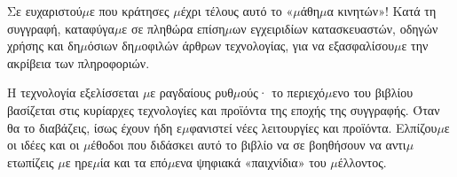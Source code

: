 
Σε ευχαριστού$\mu$ε που κράτησες $\mu$έχρι τέλους αυτό το «$\mu$άθη$\mu$α κινητών»! Κατά τη συγγραφή, καταφύγα$\mu$ε σε πληθώρα επίση$\mu$ων εγχειριδίων κατασκευαστών, οδηγών χρήσης και δη$\mu$όσιων δη$\mu$οφιλών άρθρων τεχνολογίας, για να εξασφαλίσου$\mu$ε την ακρίβεια των πληροφοριών.

Η τεχνολογία εξελίσσεται $\mu$ε ραγδαίους ρυθ$\mu$ούς· το περιεχό$\mu$ενο του βιβλίου βασίζεται στις κυρίαρχες τεχνολογίες και προϊόντα της εποχής της συγγραφής. Όταν θα το διαβάζεις, ίσως έχουν ήδη ε$\mu$φανιστεί νέες λειτουργίες και προϊόντα. Ελπίζου$\mu$ε οι ιδέες και οι $\mu$έθοδοι που διδάσκει αυτό το βιβλίο να σε βοηθήσουν να αντι$\mu$ετωπίζεις $\mu$ε ηρε$\mu$ία και τα επό$\mu$ενα ψηφιακά «παιχνίδια» του $\mu$έλλοντος.


